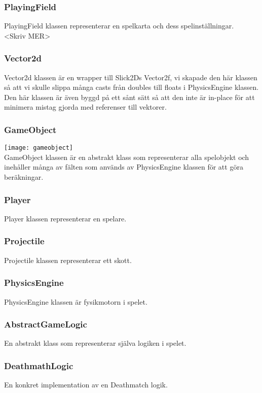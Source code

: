 \subsubsection{PlayingField}
PlayingField klassen representerar en spelkarta och dess spelinställningar.\\
<Skriv MER>\\
\subsubsection{Vector2d}
Vector2d klassen är en wrapper till Slick2Ds Vector2f, vi skapade den här klassen så att vi skulle slippa många casts från doubles till floats i PhysicsEngine klassen. Den här klassen är även byggd på ett sånt sätt så att den inte är in-place för att minimera mistag gjorda med referenser till vektorer.\\
\subsubsection{GameObject}
\texttt{[image: gameobject]}\\
GameObject klassen är en abstrakt klass som representerar alla spelobjekt och inehåller många av fälten som används av PhysicsEngine klassen för att göra beräkningar.\\
\subsubsection{Player}
Player klassen representerar en spelare.\\
\subsubsection{Projectile}
Projectile klassen representerar ett skott.\\
\subsubsection{PhysicsEngine}
PhysicsEngine klassen är fysikmotorn i spelet.\\
\subsubsection{AbstractGameLogic}
En abstrakt klass som representerar själva logiken i spelet.\\
\subsubsection{DeathmathLogic}
En konkret implementation av en Deathmatch logik.\\
